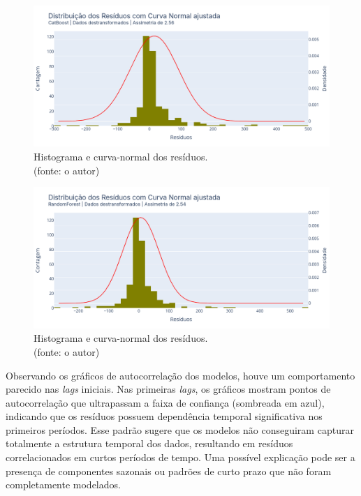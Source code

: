 \begin{figure}[!h]
\centering
\includegraphics[scale=0.33]{Figuras/jequiti/resultados/CB_WFV_LOG_RESID_x_CURVA_NORMAL.png}
\caption{Histograma e curva-normal dos resíduos.\\(fonte: o autor)}
\label{fig:jequiti_CB_WFV_LOG_RESID_x_CURVA_NORMAL}
\end{figure}

\begin{figure}[!h]
\centering
\includegraphics[scale=0.33]{Figuras/jequiti/resultados/RF_WFV_LOG_RESID_x_CURVA_NORMAL.png}
\caption{Histograma e curva-normal dos resíduos.\\(fonte: o autor)}
\label{fig:jequiti_RF_WFV_LOG_RESID_x_CURVA_NORMAL}
\end{figure}
\clearpage

Observando os gráficos de autocorrelação dos modelos, houve um comportamento parecido nas \textit{lags} iniciais. Nas primeiras \textit{lags}, os gráficos mostram pontos de autocorrelação que ultrapassam a faixa de confiança (sombreada em azul), indicando que os resíduos possuem dependência temporal significativa nos primeiros períodos. Esse padrão sugere que os modelos não conseguiram capturar totalmente a estrutura temporal dos dados, resultando em resíduos correlacionados em curtos períodos de tempo. Uma possível explicação pode ser a presença de componentes sazonais ou padrões de curto prazo que não foram completamente modelados.

